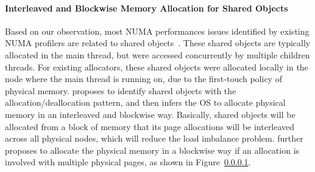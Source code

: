 \paragraph{Interleaved and Blockwise Memory Allocation for Shared Objects} Based on our observation, most NUMA performances issues identified by existing NUMA profilers are related to shared objects~\cite{XULIU, MemProf}. These shared objects are typically allocated in the main thread, but were accessed concurrently by multiple children threads. For existing allocators, these shared objects were allocated locally in the node where the main thread is running on, due to the first-touch policy of physical memory. \NA{} proposes to identify shared objects with the allocation/deallocation pattern, and then infers the OS to allocate physical memory in an interleaved and blockwise way. Basically, shared objects will be allocated from a block of memory that its page allocations will be interleaved across all physical nodes, which will reduce the load imbalance problem. \NA{} further proposes to allocate the physical memory in a blockwise way if an allocation is involved with multiple physical pages, as shown in Figure~\ref{}.   
 
  

